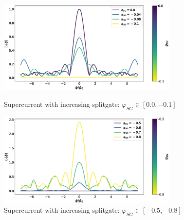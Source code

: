 \documentclass[a4paper]{article}
\begin{document}
\begin{figure}[h!]
\centering
\includegraphics[width=0.8\textwidth]{qpc-edges-0-01}
\caption{Supercurrent with increasing splitgate: $\varphi_{SG} \in [0.0, -0.1]$}
\includegraphics[width=0.8\textwidth]{qpc-edges-05-08}
\caption{Supercurrent with increasing splitgate: $\varphi_{SG} \in [-0.5, -0.8]$}
\end{figure}

\newpage
\end{document}
